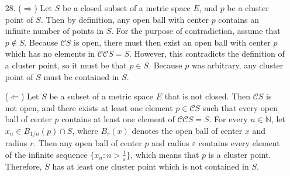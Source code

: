 \documentclass[a4paper,12pt]{article}
\begin{document}
\begin{enumerate}
        \item[28.]
            ($\Rightarrow$) Let $S$ be a closed subset of a metric space $E$, and $p$ be a cluster point of $S$. Then by definition, any open ball with center $p$ contains an infinite number of points in $S$. For the purpose of contradiction, assume that $p \notin S$. Because $\mathcal{C}S$ is open, there must then exist an open ball with center $p$ which has no elements in $\mathcal{C}\mathcal{C}S = S$. However, this contradicts the definition of a cluster point, so it must be that $p \in S$. Because $p$ was arbitrary, any cluster point of $S$ must be contained in $S$. \par
            ($\Leftarrow$) Let $S$ be a subset of a metric space $E$ that is not closed. Then $\mathcal{C}S$ is not open, and there exists at least one element $p \in \mathcal{C}S$ such that every open ball of center $p$ contains at least one element of $\mathcal{C}\mathcal{C}S = S$. For every $n \in \mathbb{N}$, let $x_n \in B_{1/n}(p) \cap S$, where $B_r(x)$ denotes the open ball of center $x$ and radius $r$. Then any open ball of center $p$ and radius $\varepsilon$ contains every element of the infinite sequence $\{x_n : n > \frac{1}{\varepsilon}\}$, which means that $p$ is a cluster point. Therefore, $S$ has at least one cluster point which is not contained in $S$.


\end{enumerate}
\end{document}
